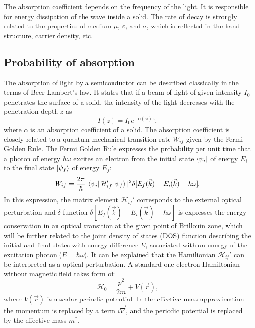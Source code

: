 \documentclass[titlepage,a4paper]{book}
\newcommand{\wciecie}{\quad\phantom{v}}
\begin{document}
The absorption coefficient depends on the frequency of the light. It is responsible for energy dissipation of the wave inside a solid. The rate of decay is strongly related to the properties of medium $\mu$, $\varepsilon$, and $\sigma$, which is reflected in the band structure, carrier density, etc.

\subsection{Probability of absorption}
\label{section:oscillator_strength}
\wciecie
The absorption of light by a semiconductor can be described classically in the terms of Beer-Lambert's law. It states that if a beam of light of given intensity $I_0$ penetrates the surface of a solid, the intensity of the light decreases with the penetration depth $z$ as
\begin{equation}
\label{eq:L-B_law}
I(z) = I_0 e^{-\alpha (\omega) z},
\end{equation}
where $\alpha$ is an absorption coefficient of a solid. The absorption coefficient is closely related to a quantum-mechanical transition rate $W_{if}$ given by the Fermi Golden Rule. The Fermi Golden Rule expresses the probability per unit time that a photon of energy $\hbar\omega$ excites an electron from the initial state $\bra{\psi_i}$ of energy $E_i$ to the final state $\ket{\psi_f}$ of energy $E_f$:
\begin{equation}
W_{if} = \frac{2\pi}{\hbar} |\bra{\psi_i}\mathcal{H}_{if}'\ket{\psi_f}|^2 \delta [E_f(\vec{k}) - E_i(\vec{k})-\hbar\omega].
\label{eq:FermiGolderRule}
\end{equation}
In this expression, the matrix element $\mathcal{H}_{if}'$ corresponds to the external optical perturbation and $\delta$-function $\delta [E_f(\vec{k}) - E_i(\vec{k})-\hbar\omega]$ is expresses the energy conservation in an optical transition at the given point of Brillouin zone, which will be further related to the joint density of states (DOS) function describing the initial and final states with energy difference $E$, associated with an energy of the excitation photon ($E = \hbar \omega$). It can be explained that the Hamiltonian $\mathcal{H}_{if}'$ can be interpreted as a optical perturbation. A standard one-electron Hamiltonian without magnetic field takes form of:
\begin{equation}
\label{eq:Perturbed_Hamiltonian}
\mathcal{H}_0 = \frac{p^2}{2m} + V(\vec{r}),
\end{equation}  
where $V(\vec{r})$ is a scalar periodic potential. In the effective mass approximation the momentum is replaced by a term $i\vec{\nabla}$, and the periodic potential is replaced by the effective mass $m^*$. 
\end{document}
